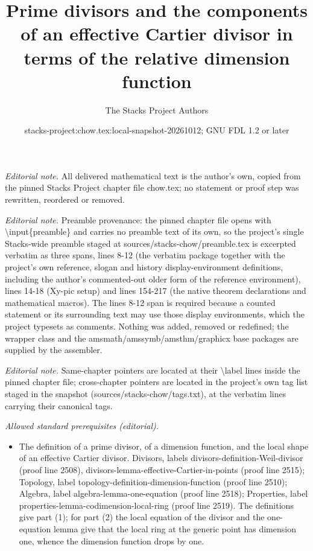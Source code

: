 \documentclass[10pt,a4paper]{amsart}
\title{Prime divisors and the components of an effective Cartier divisor in terms of the relative dimension function}
\author{The Stacks Project Authors}
\date{stacks-project:chow.tex:local-snapshot-20261012; GNU FDL 1.2 or later}
\theoremstyle{plain}
\theoremstyle{definition}
\theoremstyle{remark}
\numberwithin{equation}{subsection}
\begin{document}
\maketitle
\noindent\textit{Editorial note.} All delivered mathematical text is the author's own, copied from the pinned Stacks Project chapter file chow.tex; no statement or proof step was rewritten, reordered or removed.\par\medskip
\noindent\textit{Editorial note.} Preamble provenance: the pinned chapter file opens with \textbackslash{}input\{preamble\} and carries no preamble text of its own, so the project's single Stacks-wide preamble staged at sources/stacks-chow/preamble.tex is excerpted verbatim as three spans, lines 8-12 (the verbatim package together with the project's own reference, slogan and history display-environment definitions, including the author's commented-out older form of the reference environment), lines 14-18 (Xy-pic setup) and lines 154-217 (the native theorem declarations and mathematical macros). The lines 8-12 span is required because a counted statement or its surrounding text may use those display environments, which the project typesets as comments. Nothing was added, removed or redefined; the wrapper class and the amsmath/amssymb/amsthm/graphicx base packages are supplied by the assembler.\par\medskip
\noindent\textit{Editorial note.} Same-chapter pointers are located at their \textbackslash{}label lines inside the pinned chapter file; cross-chapter pointers are located in the project's own tag list staged in the snapshot (sources/stacks-chow/tags.txt), at the verbatim lines carrying their canonical tags.\par\medskip
\noindent\textit{Allowed standard prerequisites (editorial).}\begin{itemize}
\item The definition of a prime divisor, of a dimension function, and the local shape of an effective Cartier divisor. Divisors, labels divisors-definition-Weil-divisor (proof line 2508), divisors-lemma-effective-Cartier-in-points (proof line 2515); Topology, label topology-definition-dimension-function (proof line 2510); Algebra, label algebra-lemma-one-equation (proof line 2518); Properties, label properties-lemma-codimension-local-ring (proof line 2519). The definitions give part (1); for part (2) the local equation of the divisor and the one-equation lemma give that the local ring at the generic point has dimension one, whence the dimension function drops by one.
\end{itemize}\medskip
\end{document}
